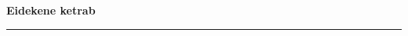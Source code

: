 \documentclass[10pt]{book}
\begin{document}
{
  \samepage
  \raggedbottom
  \raggedright
  \sloppy


  \vspace{0.2in}

  \noindent\begin{minipage}{.1\textwidth}
    \hfill\vspace{0.1in}
  \end{minipage}%
  \noindent\begin{minipage}{.8\textwidth}
    \centering
    \bfseries
    \large Eidekene ketrab
  \end{minipage}%
  \noindent\begin{minipage}{.1\textwidth}
      \hfill\vspace{0.1in}
  \end{minipage}

  \nopagebreak[4]
  \vspace{0.1in}
  \nopagebreak[4]
  \hrule height 0.05ex
  \nopagebreak[4]
  \vspace{-0.05in}




}
\end{document}
